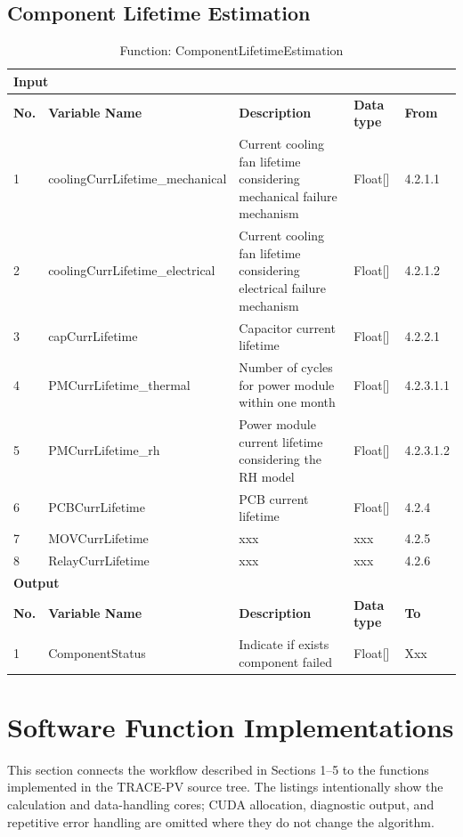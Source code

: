 \documentclass{article}
\begin{document}
\subsection{Component Lifetime Estimation}
\begin{table}[h]
\centering
\caption{Function: ComponentLifetimeEstimation}
\begin{tabular}{|l|p{4cm}|p{5cm}|l|l|}
\hline
\multicolumn{5}{|l|}{\textbf{Input}} \\ \hline
\textbf{No.} & \textbf{Variable Name} & \textbf{Description} & \textbf{Data type} & \textbf{From} \\ \hline
1 & coolingCurrLifetime\_mechanical & Current cooling fan lifetime considering mechanical failure mechanism & Float[] & 4.2.1.1 \\ \hline
2 & coolingCurrLifetime\_electrical & Current cooling fan lifetime considering electrical failure mechanism & Float[] & 4.2.1.2 \\ \hline
3 & capCurrLifetime & Capacitor current lifetime & Float[] & 4.2.2.1 \\ \hline
4 & PMCurrLifetime\_thermal & Number of cycles for power module within one month & Float[] & 4.2.3.1.1 \\ \hline
5 & PMCurrLifetime\_rh & Power module current lifetime considering the RH model & Float[] & 4.2.3.1.2 \\ \hline
6 & PCBCurrLifetime & PCB current lifetime & Float[] & 4.2.4 \\ \hline
7 & MOVCurrLifetime & xxx & xxx & 4.2.5 \\ \hline
8 & RelayCurrLifetime & xxx & xxx & 4.2.6 \\ \hline
\multicolumn{5}{|l|}{\textbf{Output}} \\ \hline
\textbf{No.} & \textbf{Variable Name} & \textbf{Description} & \textbf{Data type} & \textbf{To} \\ \hline
1 & ComponentStatus & Indicate if exists component failed & Float[] & Xxx \\ \hline
\end{tabular}
\end{table}

\clearpage
\section{Software Function Implementations}
\label{sec:function-implementations}
This section connects the workflow described in Sections 1--5 to the functions
implemented in the TRACE-PV source tree.  The listings intentionally show the
calculation and data-handling cores; CUDA allocation, diagnostic output, and
repetitive error handling are omitted where they do not change the algorithm.
\end{document}
